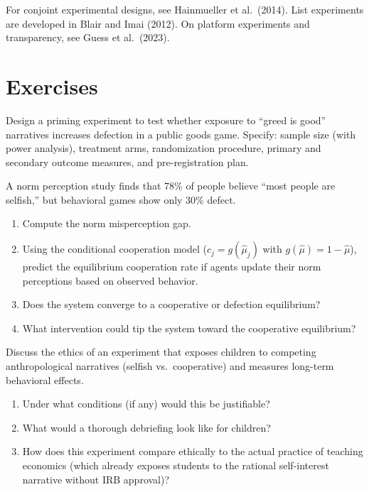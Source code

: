 For conjoint experimental designs, see Hainmueller et al.\ (2014).
List experiments are developed in Blair and Imai (2012).
On platform experiments and transparency, see Guess et al.\ (2023).

\section{Exercises}

\begin{exercise}
Design a priming experiment to test whether exposure to ``greed is good'' narratives increases defection in a public goods game.
Specify: sample size (with power analysis), treatment arms, randomization procedure, primary and secondary outcome measures, and pre-registration plan.
\end{exercise}

\begin{exercise}
A norm perception study finds that 78\% of people believe ``most people are selfish,'' but behavioral games show only 30\% defect.
\begin{enumerate}[nosep]
  \item Compute the norm misperception gap.
  \item Using the conditional cooperation model ($c_j = g(\hat{\mu}_j)$ with $g(\hat{\mu}) = 1 - \hat{\mu}$), predict the equilibrium cooperation rate if agents update their norm perceptions based on observed behavior.
  \item Does the system converge to a cooperative or defection equilibrium?
  \item What intervention could tip the system toward the cooperative equilibrium?
\end{enumerate}
\end{exercise}

\begin{exercise}
Discuss the ethics of an experiment that exposes children to competing anthropological narratives (selfish vs.\ cooperative) and measures long-term behavioral effects.
\begin{enumerate}[nosep]
  \item Under what conditions (if any) would this be justifiable?
  \item What would a thorough debriefing look like for children?
  \item How does this experiment compare ethically to the actual practice of teaching economics (which already exposes students to the rational self-interest narrative without IRB approval)?
\end{enumerate}
\end{exercise}


